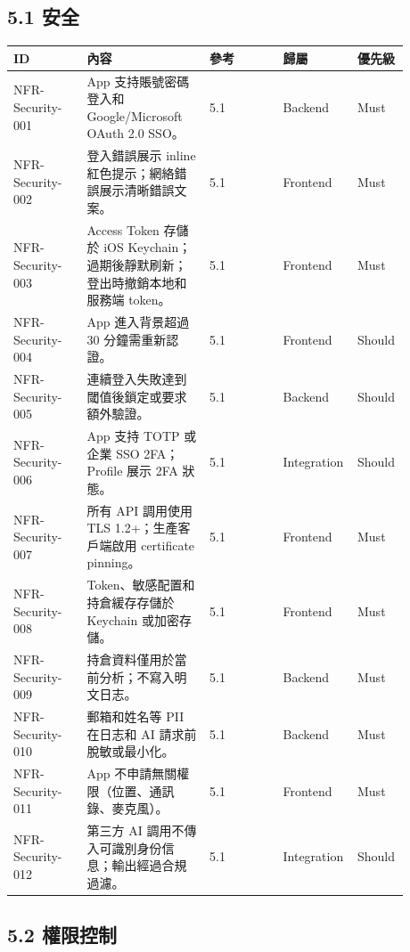 \subsection{5.1 安全}

\begingroup
\small
\begin{longtable}{L{0.18\linewidth}L{0.30\linewidth}L{0.18\linewidth}L{0.12\linewidth}L{0.10\linewidth}}
\toprule
\textbf{ID} & \textbf{內容} & \textbf{參考} & \textbf{歸屬} & \textbf{優先級} \\
\midrule
NFR-Security-001 & App 支持賬號密碼登入和 Google/Microsoft OAuth 2.0 SSO。 & 5.1 & Backend & Must \\
NFR-Security-002 & 登入錯誤展示 inline 紅色提示；網絡錯誤展示清晰錯誤文案。 & 5.1 & Frontend & Must \\
NFR-Security-003 & Access Token 存儲於 iOS Keychain；過期後靜默刷新；登出時撤銷本地和服務端 token。 & 5.1 & Frontend & Must \\
NFR-Security-004 & App 進入背景超過 30 分鐘需重新認證。 & 5.1 & Frontend & Should \\
NFR-Security-005 & 連續登入失敗達到閾值後鎖定或要求額外驗證。 & 5.1 & Backend & Should \\
NFR-Security-006 & App 支持 TOTP 或企業 SSO 2FA；Profile 展示 2FA 狀態。 & 5.1 & Integration & Should \\
NFR-Security-007 & 所有 API 調用使用 TLS 1.2+；生產客戶端啟用 certificate pinning。 & 5.1 & Frontend & Must \\
NFR-Security-008 & Token、敏感配置和持倉緩存存儲於 Keychain 或加密存儲。 & 5.1 & Frontend & Must \\
NFR-Security-009 & 持倉資料僅用於當前分析；不寫入明文日志。 & 5.1 & Backend & Must \\
NFR-Security-010 & 郵箱和姓名等 PII 在日志和 AI 請求前脫敏或最小化。 & 5.1 & Backend & Must \\
NFR-Security-011 & App 不申請無關權限（位置、通訊錄、麥克風）。 & 5.1 & Frontend & Must \\
NFR-Security-012 & 第三方 AI 調用不傳入可識別身份信息；輸出經過合規過濾。 & 5.1 & Integration & Should \\
\bottomrule
\end{longtable}
\endgroup

\subsection{5.2 權限控制}

